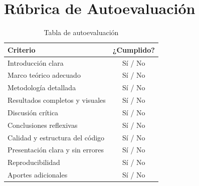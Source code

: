 \documentclass[conference]{IEEEtran}
\begin{document}
\section{Rúbrica de Autoevaluación}

\begin{table}[h]
\centering
\begin{tabular}{|l|c|}
\hline
\textbf{Criterio} & \textbf{¿Cumplido?} \\
\hline
Introducción clara & Sí / No \\
Marco teórico adecuado & Sí / No \\
Metodología detallada & Sí / No \\
Resultados completos y visuales & Sí / No \\
Discusión crítica & Sí / No \\
Conclusiones reflexivas & Sí / No \\
Calidad y estructura del código & Sí / No \\
Presentación clara y sin errores & Sí / No \\
Reproducibilidad & Sí / No \\
Aportes adicionales & Sí / No \\
\hline
\end{tabular}
\caption{Tabla de autoevaluación}
\end{table}
\end{document}
